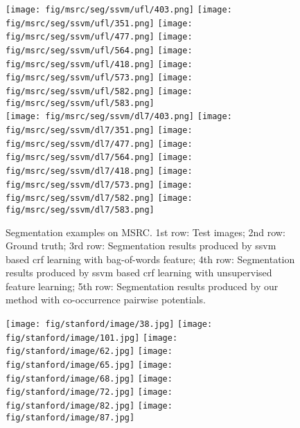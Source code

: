 \documentclass[10pt,3p]{elsarticle}
\newcommand{\ssvm}{{\sc ssvm}\xspace}
\newcommand{\crf}{{\sc crf}\xspace}
\begin{document}
\begin{figure}[!t]
%
	\texttt{[image: fig/msrc/seg/ssvm/ufl/403.png]}
     \texttt{[image: fig/msrc/seg/ssvm/ufl/351.png]}     
	\texttt{[image: fig/msrc/seg/ssvm/ufl/477.png]}
    \texttt{[image: fig/msrc/seg/ssvm/ufl/564.png]}
     \texttt{[image: fig/msrc/seg/ssvm/ufl/418.png]}
     \texttt{[image: fig/msrc/seg/ssvm/ufl/573.png]}   
     \texttt{[image: fig/msrc/seg/ssvm/ufl/582.png]} 
     \texttt{[image: fig/msrc/seg/ssvm/ufl/583.png]}\\
     
     
     \texttt{[image: fig/msrc/seg/ssvm/dl7/403.png]}
     \texttt{[image: fig/msrc/seg/ssvm/dl7/351.png]}     
	\texttt{[image: fig/msrc/seg/ssvm/dl7/477.png]}
    \texttt{[image: fig/msrc/seg/ssvm/dl7/564.png]}
     \texttt{[image: fig/msrc/seg/ssvm/dl7/418.png]}
     \texttt{[image: fig/msrc/seg/ssvm/dl7/573.png]}   
     \texttt{[image: fig/msrc/seg/ssvm/dl7/582.png]} 
     \texttt{[image: fig/msrc/seg/ssvm/dl7/583.png]}\\

\caption{Segmentation examples on MSRC. 1st row: Test images; 2nd row: Ground truth; 
%
3rd row: Segmentation results produced by \ssvm based \crf learning with bag-of-words feature;
4th row: Segmentation results produced by \ssvm based \crf learning with unsupervised feature learning; 
5th row: Segmentation results produced by our method with co-occurrence pairwise potentials. }
    \label{fig:seg_msrc}      
\end{figure}\begin{figure}[!t]
\centering
%
	\texttt{[image: fig/stanford/image/38.jpg]}
     \texttt{[image: fig/stanford/image/101.jpg]}     
	\texttt{[image: fig/stanford/image/62.jpg]}
    \texttt{[image: fig/stanford/image/65.jpg]}
     \texttt{[image: fig/stanford/image/68.jpg]}
     \texttt{[image: fig/stanford/image/72.jpg]}   
     \texttt{[image: fig/stanford/image/82.jpg]} 
     \texttt{[image: fig/stanford/image/87.jpg]}\\
     

\end{figure}
\end{document}
